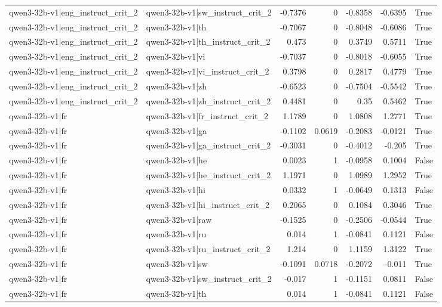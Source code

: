 \begin{table}
\begin{tabular}{l l r r r r l}
qwen3-32b-v1|eng_instruct_crit_2 & qwen3-32b-v1|sw_instruct_crit_2 & -0.7376 & 0 & -0.8358 & -0.6395 & True \\
qwen3-32b-v1|eng_instruct_crit_2 & qwen3-32b-v1|th & -0.7067 & 0 & -0.8048 & -0.6086 & True \\
qwen3-32b-v1|eng_instruct_crit_2 & qwen3-32b-v1|th_instruct_crit_2 & 0.473 & 0 & 0.3749 & 0.5711 & True \\
qwen3-32b-v1|eng_instruct_crit_2 & qwen3-32b-v1|vi & -0.7037 & 0 & -0.8018 & -0.6055 & True \\
qwen3-32b-v1|eng_instruct_crit_2 & qwen3-32b-v1|vi_instruct_crit_2 & 0.3798 & 0 & 0.2817 & 0.4779 & True \\
qwen3-32b-v1|eng_instruct_crit_2 & qwen3-32b-v1|zh & -0.6523 & 0 & -0.7504 & -0.5542 & True \\
qwen3-32b-v1|eng_instruct_crit_2 & qwen3-32b-v1|zh_instruct_crit_2 & 0.4481 & 0 & 0.35 & 0.5462 & True \\
qwen3-32b-v1|fr & qwen3-32b-v1|fr_instruct_crit_2 & 1.1789 & 0 & 1.0808 & 1.2771 & True \\
qwen3-32b-v1|fr & qwen3-32b-v1|ga & -0.1102 & 0.0619 & -0.2083 & -0.0121 & True \\
qwen3-32b-v1|fr & qwen3-32b-v1|ga_instruct_crit_2 & -0.3031 & 0 & -0.4012 & -0.205 & True \\
qwen3-32b-v1|fr & qwen3-32b-v1|he & 0.0023 & 1 & -0.0958 & 0.1004 & False \\
qwen3-32b-v1|fr & qwen3-32b-v1|he_instruct_crit_2 & 1.1971 & 0 & 1.0989 & 1.2952 & True \\
qwen3-32b-v1|fr & qwen3-32b-v1|hi & 0.0332 & 1 & -0.0649 & 0.1313 & False \\
qwen3-32b-v1|fr & qwen3-32b-v1|hi_instruct_crit_2 & 0.2065 & 0 & 0.1084 & 0.3046 & True \\
qwen3-32b-v1|fr & qwen3-32b-v1|raw & -0.1525 & 0 & -0.2506 & -0.0544 & True \\
qwen3-32b-v1|fr & qwen3-32b-v1|ru & 0.014 & 1 & -0.0841 & 0.1121 & False \\
qwen3-32b-v1|fr & qwen3-32b-v1|ru_instruct_crit_2 & 1.214 & 0 & 1.1159 & 1.3122 & True \\
qwen3-32b-v1|fr & qwen3-32b-v1|sw & -0.1091 & 0.0718 & -0.2072 & -0.011 & True \\
qwen3-32b-v1|fr & qwen3-32b-v1|sw_instruct_crit_2 & -0.017 & 1 & -0.1151 & 0.0811 & False \\
qwen3-32b-v1|fr & qwen3-32b-v1|th & 0.014 & 1 & -0.0841 & 0.1121 & False \\

\end{tabular}
\end{table}

